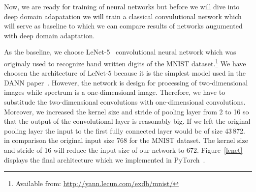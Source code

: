 Now, we are ready for training of neural networks
but before we will dive into deep domain adapatation
we will train a classical convulutional network
which will serve as baseline to
which we can compare results of networks augumented with deep domain adaptation.

As the baseline, we choose LeNet-5~\cite{lecun1998} convolutional neural network
which was originaly used to recognize hand written digits
of the MNIST dataset.\footnote{Available from: \url{http://yann.lecun.com/exdb/mnist/}}
We have choosen the architecture of LeNet-5
because it is the simplest model used in the DANN paper~\cite{ganin2016}.
However, the network is design for processing of two-dimensional images
while spectrum is a one-dimensional image.
Therefore, we have to substitude the two-dimensional convolutions with one-dimensional convolutions.
Moreover, we increased the kernel size and stride of pooling layer from 2 to 16
so that the output of the convolutional layer is reasonably big.
If we left the original pooling layer
the input to the first fully connected layer would be of size 43\,872.
in comparison the original input size 768 for the MNIST dataset.
The kernel size and stride of 16 will reduce the input size of our network to 672.
Figure~\ref{lenet} displays the final architecture
which we implemented in PyTorch~\cite{paszke2019}.

